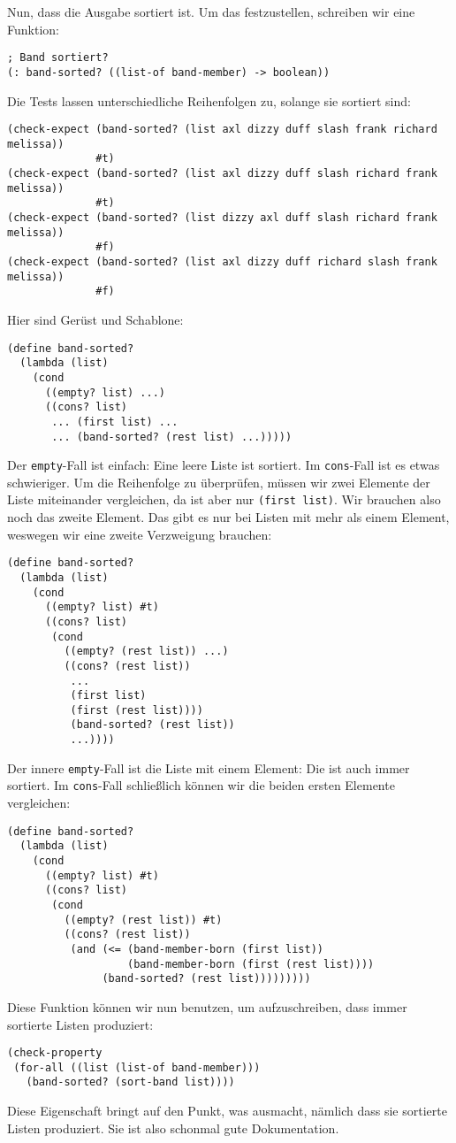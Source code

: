 Nun, dass die Ausgabe sortiert ist.  Um das festzustellen, schreiben
wir eine Funktion:
%
\begin{lstlisting}
; Band sortiert?
(: band-sorted? ((list-of band-member) -> boolean))
\end{lstlisting}
%
Die Tests lassen unterschiedliche Reihenfolgen zu, solange sie
sortiert sind:
%
\begin{lstlisting}
(check-expect (band-sorted? (list axl dizzy duff slash frank richard melissa))
              #t)
(check-expect (band-sorted? (list axl dizzy duff slash richard frank melissa))
              #t)
(check-expect (band-sorted? (list dizzy axl duff slash richard frank melissa))
              #f)
(check-expect (band-sorted? (list axl dizzy duff richard slash frank melissa))
              #f)
\end{lstlisting}
%
Hier sind Gerüst und Schablone:
%
\begin{lstlisting}
(define band-sorted?
  (lambda (list)
    (cond
      ((empty? list) ...)
      ((cons? list)
       ... (first list) ...
       ... (band-sorted? (rest list) ...)))))
\end{lstlisting}
%
Der \lstinline{empty}-Fall ist einfach: Eine leere Liste ist sortiert.
Im \lstinline{cons}-Fall ist es etwas schwieriger.  Um die Reihenfolge
zu überprüfen, müssen wir zwei Elemente der Liste miteinander
vergleichen, da ist aber nur \lstinline{(first list)}.  Wir brauchen
also noch das zweite Element.  Das gibt es nur bei Listen mit mehr als
einem Element, weswegen wir eine zweite Verzweigung brauchen:
%
\begin{lstlisting}
(define band-sorted?
  (lambda (list)
    (cond
      ((empty? list) #t)
      ((cons? list)
       (cond
         ((empty? (rest list)) ...)
         ((cons? (rest list))
          ...
          (first list)
          (first (rest list))))
          (band-sorted? (rest list))
          ...))))
\end{lstlisting}
%
Der innere \lstinline{empty}-Fall ist die Liste mit einem Element: Die
ist auch immer sortiert.  Im \lstinline{cons}-Fall schließlich können
wir die beiden ersten Elemente vergleichen:
%
\begin{lstlisting}
(define band-sorted?
  (lambda (list)
    (cond
      ((empty? list) #t)
      ((cons? list)
       (cond
         ((empty? (rest list)) #t)
         ((cons? (rest list))
          (and (<= (band-member-born (first list))
                   (band-member-born (first (rest list))))
               (band-sorted? (rest list)))))))))
\end{lstlisting}
%
Diese Funktion können wir nun benutzen, um aufzuschreiben, dass
 immer sortierte Listen produziert:
%
\begin{lstlisting}
(check-property
 (for-all ((list (list-of band-member)))
   (band-sorted? (sort-band list))))
\end{lstlisting}
%
Diese Eigenschaft bringt auf den Punkt, was 
ausmacht, nämlich dass sie sortierte Listen produziert.  Sie ist also
schonmal gute Dokumentation.

